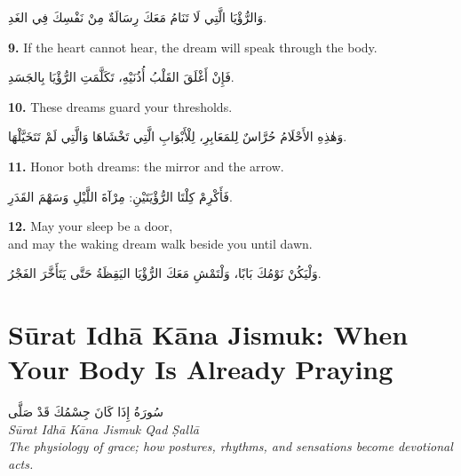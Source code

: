 \documentclass[11pt,a4paper,twoside]{book}
\begin{document}
\begin{flushright}
{\arabicfont
وَالرُّؤْيَا الَّتِي لَا تَنَامُ مَعَكَ
رِسَالَةٌ مِنْ نَفْسِكَ فِي الغَدِ.}
\end{flushright}

\vspace{1em}
{\color{indigo}\bfseries 9.}\quad
If the heart cannot hear, the dream will speak through the body.

\begin{flushright}
{\arabicfont
فَإِنْ أَغْلَقَ القَلْبُ أُذُنَيْهِ،
تَكَلَّمَتِ الرُّؤْيَا بِالجَسَدِ.}
\end{flushright}

\vspace{1em}
{\color{indigo}\bfseries 10.}\quad
These dreams guard your thresholds.

\begin{flushright}
{\arabicfont
وَهٰذِهِ الأَحْلَامُ حُرَّاسٌ لِلمَعَابِرِ،
لِلْأَبْوَابِ الَّتِي تَخْشَاهَا وَالَّتِي لَمْ تَتَخَيَّلْهَا.}
\end{flushright}

\vspace{1em}
{\color{indigo}\bfseries 11.}\quad
Honor both dreams: the mirror and the arrow.

\begin{flushright}
{\arabicfont
فَأَكْرِمْ كِلْتَا الرُّؤْيَتَيْنِ:
مِرْآةَ اللَّيْلِ وَسَهْمَ القَدَرِ.}
\end{flushright}

\vspace{1em}
{\color{indigo}\bfseries 12.}\quad
May your sleep be a door,\\
and may the waking dream walk beside you until dawn.

\begin{flushright}
{\arabicfont
وَلْيَكُنْ نَوْمُكَ بَابًا،
وَلْتَمْشِ مَعَكَ الرُّؤْيَا اليَقِظَةُ
حَتَّى يَتَأَخَّرَ الفَجْرُ.}
\end{flushright}

\clearpage


\chapter*{Sūrat Idhā Kāna Jismuk: When Your Body Is Already Praying}
\begin{center}
{\arabicfont\Large سُورَةُ إِذَا كَانَ جِسْمُكَ قَدْ صَلَّى}\\[5pt]
{\small\itshape Sūrat Idhā Kāna Jismuk Qad Ṣallā}\\[1em]
{\color{sage}\itshape The physiology of grace; how postures, rhythms, and sensations become devotional acts.}
\end{center}
\end{document}
